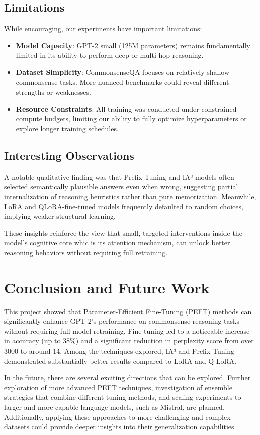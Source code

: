 \documentclass[11pt,twocolumn]{article}
\begin{document}
\subsection{Limitations}
While encouraging, our experiments have important limitations:
\begin{itemize}
    \item \textbf{Model Capacity}: GPT-2 small (125M parameters) remains fundamentally limited in its ability to perform deep or multi-hop reasoning.
    \item \textbf{Dataset Simplicity}: CommonsenseQA focuses on relatively shallow commonsense tasks. More nuanced benchmarks could reveal different strengths or weaknesses.
    \item \textbf{Resource Constraints}: All training was conducted under constrained compute budgets, limiting our ability to fully optimize hyperparameters or explore longer training schedules.
\end{itemize}

\subsection{Interesting Observations}
A notable qualitative finding was that Prefix Tuning and IA³ models often selected semantically plausible answers even when wrong, suggesting partial internalization of reasoning heuristics rather than pure memorization. Meanwhile, LoRA and QLoRA-fine-tuned models frequently defaulted to random choices, implying weaker structural learning.

These insights reinforce the view that small, targeted interventions inside the model's cognitive core whic is its attention mechanism, can unlock better reasoning behaviors without requiring full retraining.

\section{Conclusion and Future Work}
\label{sec:conclusion}

This project showed that Parameter-Efficient Fine-Tuning (PEFT) methods can significantly enhance GPT-2's performance on commonsense reasoning tasks without requiring full model retraining. Fine-tuning led to a noticeable increase in accuracy (up to 38\%) and a significant reduction in perplexity score from over 3000 to around 14. Among the techniques explored, IA³ and Prefix Tuning demonstrated substantially better results compared to LoRA and Q-LoRA.

In the future, there are several exciting directions that can be explored. Further exploration of more advanced PEFT techniques, investigation of ensemble strategies that combine different tuning methods, and scaling experiments to larger and more capable language models, such as Mistral, are planned. Additionally, applying these approaches to more challenging and complex datasets could provide deeper insights into their generalization capabilities.


\printbibliography[
heading=bibintoc,
title={References}
]
\end{document}
